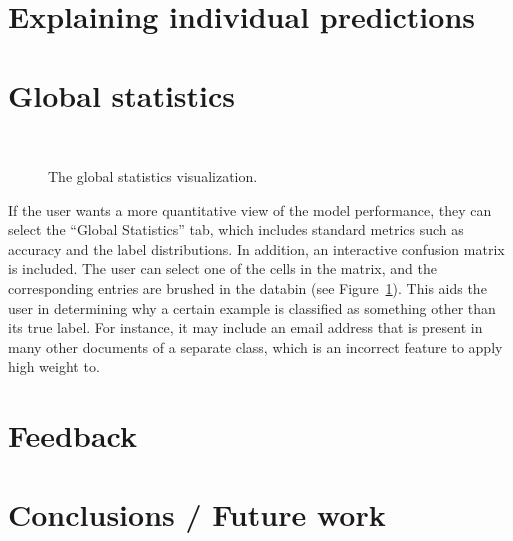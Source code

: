 \documentclass{chi2009}
\begin{document}
\section{Explaining individual predictions}
\section{Global statistics}
\begin{figure}
  \\
  \caption{The global statistics visualization.}
  \label{fig:statistics}
\end{figure}

If the user wants a more quantitative view of the model performance, they can
select the ``Global Statistics'' tab, which includes standard metrics such as
accuracy and the label distributions. In addition, an interactive confusion
matrix is included. The user can select one of the cells in the matrix, and the
corresponding entries are brushed in the databin (see
Figure~\ref{fig:statistics}). This aids the user in determining why a certain
example is classified as something other than its true label. For instance, it
may include an email address that is present in many other documents of a
separate class, which is an incorrect feature to apply high weight to.

\section{Feedback}
\section{Conclusions / Future work}
\end{document}
